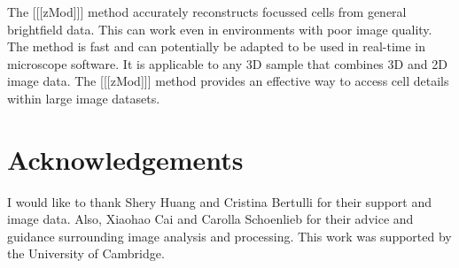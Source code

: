 \documentclass[preprint,11pt,5p,twocolumn]{elsarticle}
\begin{document}
The [[[zMod]]] method accurately reconstructs focussed cells from general brightfield data. This can work even in environments with poor image quality. The method is fast and can potentially be adapted to be used in real-time in microscope software. It is applicable to any 3D sample that combines 3D and 2D image data. The [[[zMod]]] method provides an effective way to access cell details within large image datasets.

\section{Acknowledgements}

I would like to thank Shery Huang and Cristina Bertulli for their support and image data. Also, Xiaohao Cai and Carolla Schoenlieb for their advice and guidance surrounding image analysis and processing. This work was supported by the University of Cambridge.






% 






\end{document}
